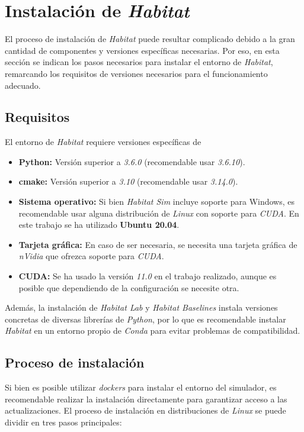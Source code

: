 \section{Instalación de \textit{Habitat}}

El proceso de instalación de \textit{Habitat} puede resultar complicado debido a la gran cantidad de componentes y versiones específicas necesarias. Por eso, en esta sección se indican los pasos necesarios para instalar el entorno de \textit{Habitat}, remarcando los requisitos de versiones necesarios para el funcionamiento adecuado.

\subsection{Requisitos}

El entorno de \textit{Habitat} requiere versiones específicas de 

\begin{itemize}
	\item \textbf{Python:} Versión superior a \textit{3.6.0} (recomendable usar \textit{3.6.10}).
	\item \textbf{cmake:} Versión superior a \textit{3.10} (recomendable usar \textit{3.14.0}).
	\item \textbf{Sistema operativo:} Si bien \textit{Habitat Sim} incluye soporte para Windows, es recomendable usar alguna distribución de \textit{Linux} con soporte para \textit{CUDA}. En este trabajo se ha utilizado \textbf{Ubuntu 20.04}.
	\item \textbf{Tarjeta gráfica:} En caso de ser necesaria, se necesita una tarjeta gráfica de \textit{nVidia} que ofrezca soporte para \textit{CUDA}.
	\item \textbf{CUDA:} Se ha usado la versión \textit{11.0} en el trabajo realizado, aunque es posible que dependiendo de la configuración se necesite otra.
\end{itemize}

Además, la instalación de \textit{Habitat Lab} y \textit{Habitat Baselines} instala versiones concretas de diversas librerías de \textit{Python}, por lo que es recomendable instalar \textit{Habitat} en un entorno propio de \textit{Conda} para evitar problemas de compatibilidad. 

\subsection{Proceso de instalación}

Si bien es posible utilizar \textit{dockers} para instalar el entorno del simulador, es recomendable realizar la instalación directamente para garantizar acceso a las actualizaciones. El proceso de instalación en distribuciones de \textit{Linux} se puede dividir en tres pasos principales:

